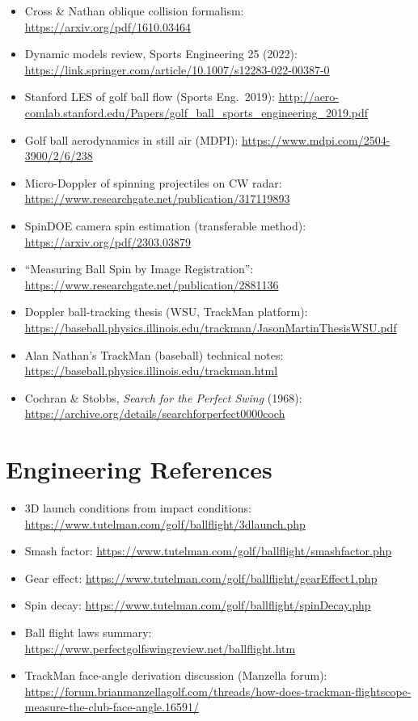\begin{itemize}
  \url{https://www.physics.usyd.edu.au/~cross/GOLF/GOLF.htm}
\item Cross \& Nathan oblique collision formalism:
  \url{https://arxiv.org/pdf/1610.03464}
\item Dynamic models review, Sports Engineering 25 (2022):
  \url{https://link.springer.com/article/10.1007/s12283-022-00387-0}
\item Stanford LES of golf ball flow (Sports Eng.\ 2019):
  \url{http://aero-comlab.stanford.edu/Papers/golf_ball_sports_engineering_2019.pdf}
\item Golf ball aerodynamics in still air (MDPI):
  \url{https://www.mdpi.com/2504-3900/2/6/238}
\item Micro-Doppler of spinning projectiles on CW radar:
  \url{https://www.researchgate.net/publication/317119893}
\item SpinDOE camera spin estimation (transferable method):
  \url{https://arxiv.org/pdf/2303.03879}
\item ``Measuring Ball Spin by Image Registration'':
  \url{https://www.researchgate.net/publication/2881136}
\item Doppler ball-tracking thesis (WSU, TrackMan platform):
  \url{https://baseball.physics.illinois.edu/trackman/JasonMartinThesisWSU.pdf}
\item Alan Nathan's TrackMan (baseball) technical notes:
  \url{https://baseball.physics.illinois.edu/trackman.html}
\item Cochran \& Stobbs, \emph{Search for the Perfect Swing} (1968):
  \url{https://archive.org/details/searchforperfect0000coch}
\end{itemize}

\section{Engineering References}
\begin{itemize}\small
\item 3D launch conditions from impact conditions:
  \url{https://www.tutelman.com/golf/ballflight/3dlaunch.php}
\item Smash factor: \url{https://www.tutelman.com/golf/ballflight/smashfactor.php}
\item Gear effect: \url{https://www.tutelman.com/golf/ballflight/gearEffect1.php}
\item Spin decay: \url{https://www.tutelman.com/golf/ballflight/spinDecay.php}
\item Ball flight laws summary:
  \url{https://www.perfectgolfswingreview.net/ballflight.htm}
\item TrackMan face-angle derivation discussion (Manzella forum):
  \url{https://forum.brianmanzellagolf.com/threads/how-does-trackman-flightscope-measure-the-club-face-angle.16591/}
\end{itemize}

